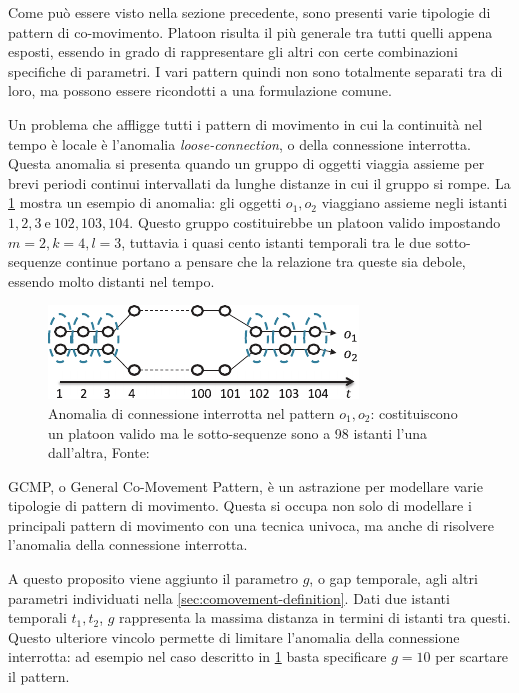 Come può essere visto nella sezione precedente, sono presenti varie tipologie di pattern di co-movimento.
Platoon risulta il più generale tra tutti quelli appena esposti, essendo in grado di rappresentare gli altri con certe combinazioni specifiche di parametri.
I vari pattern quindi non sono totalmente separati tra di loro, ma possono essere ricondotti a una formulazione comune.

Un problema che affligge tutti i pattern di movimento in cui la continuità nel tempo è locale è l'anomalia \textit{loose-connection}, o della connessione interrotta.
Questa anomalia si presenta quando un gruppo di oggetti viaggia assieme per brevi periodi continui intervallati da lunghe distanze in cui il gruppo si rompe.
La \cref{fig:chap-2:loose-couple-anomaly} mostra un esempio di anomalia: gli oggetti \(o_1, o_2\) viaggiano assieme negli istanti \(1,2,3~\text{e}~102, 103, 104\).
Questo gruppo costituirebbe un platoon valido impostando \(m = 2, k = 4, l = 3\), tuttavia i quasi cento istanti temporali tra le due sotto-sequenze continue portano a pensare che
la relazione tra queste sia debole, essendo molto distanti nel tempo.

\begin{figure}
    \centering
    \includegraphics[width=\textwidth]{res/fig/sec-2/LooseCoupleAnomaly.pdf}
    \caption{Anomalia di connessione interrotta nel pattern \(o_1, o_2\): costituiscono un platoon valido ma le sotto-sequenze sono a 98 istanti l'una dall'altra, Fonte: \cite{DBLP:journals/pvldb/FanZWT16}}%
    \label{fig:chap-2:loose-couple-anomaly}
\end{figure}

GCMP, o General Co-Movement Pattern, è un astrazione per modellare varie tipologie di pattern di movimento.
Questa si occupa non solo di modellare i principali pattern di movimento con una tecnica univoca, ma anche di risolvere l'anomalia della connessione interrotta.

A questo proposito viene aggiunto il parametro \(g\), o gap temporale, agli altri parametri individuati nella \cref{sec:comovement-definition}.
Dati due istanti temporali \( t_1, t_2\), \(g\) rappresenta la massima distanza in termini di istanti tra questi.
Questo ulteriore vincolo permette di limitare l'anomalia della connessione interrotta: ad esempio nel caso descritto in \cref{fig:chap-2:loose-couple-anomaly} basta specificare \(g = 10\)
per scartare il pattern.


